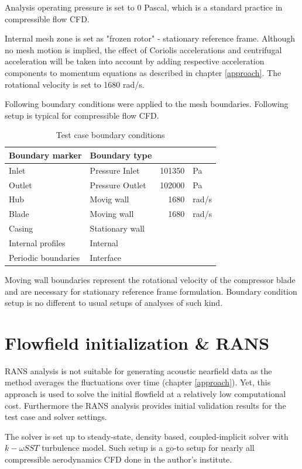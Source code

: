 Analysis operating pressure is set to 0 Pascal, which is a standard practice in compressible flow CFD.

Internal mesh zone is set as "frozen rotor" - stationary reference frame. Although no mesh motion is implied, the effect of Coriolis accelerations and centrifugal acceleration will be taken into account by adding respective acceleration components to momentum equations as described in chapter \ref{approach}. The rotational velocity is set to 1680 rad/s.

Following boundary conditions were applied to the mesh boundaries. Following setup is typical for compressible flow CFD.

\begin{table}[htb!]
\centering
\caption{Test case boundary conditions} \label{tab:testbcs}
\ttfamily
\begin{tabular}{@{}llrl@{}}
\toprule
Boundary marker & Boundary type & & \\ \midrule
Inlet & Pressure Inlet & 101350  & Pa\\
Outlet & Pressure Outlet & 102000 & Pa \\
Hub & Movig wall & 1680 & rad/s \\
Blade & Moving wall & 1680 & rad/s \\
Casing & Stationary wall & &  \\
Internal profiles & Internal & & \\
Periodic boundaries & Interface & & \\ \bottomrule
\end{tabular}
\end{table}

Moving wall boundaries represent the rotational velocity of the compressor blade and are necessary for stationary reference frame formulation. Boundary condition setup is no different to usual setups of analyses of such kind.

\section{Flowfield initialization \& RANS}
RANS analysis is not suitable for generating acoustic nearfield data as the method averages the fluctuations over time (chapter \ref{approach}). Yet, this approach is used to solve the initial flowfield at a relatively low computational cost. Furthermore the RANS analysis provides initial validation results for the test case and solver settings.

The solver is set up to steady-state, density based, coupled-implicit solver with $k-\omega SST$ turbulence model. Such setup is a go-to setup for nearly all compressible aerodynamics CFD done in the author's institute.

